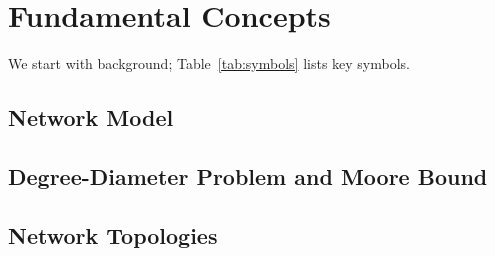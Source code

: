 \section{Fundamental Concepts}
\label{sec:back}

We start with background; Table~\ref{tab:symbols} lists 
key symbols. 

\subsection{Network Model}

\subsection{Degree-Diameter Problem and Moore Bound}

\subsection{Network Topologies}



